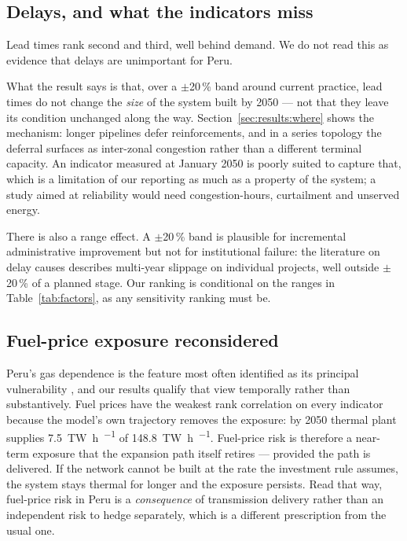 \subsection{Delays, and what the indicators miss}

Lead times rank second and third, well behind demand. We do not read this as evidence
that delays are unimportant for Peru.

What the result says is that, over a $\pm$20\,\% band around current practice, lead
times do not change the \emph{size} of the system built by 2050 --- not that they leave
its condition unchanged along the way. Section~\ref{sec:results:where} shows the
mechanism: longer pipelines defer reinforcements, and in a series topology the deferral
surfaces as inter-zonal congestion rather than a different terminal capacity. An
indicator measured at January 2050 is poorly suited to capture that, which is a
limitation of our reporting as much as a property of the system; a study aimed at
reliability would need congestion-hours, curtailment and unserved energy.

There is also a range effect. A $\pm$20\,\% band is plausible for incremental
administrative improvement but not for institutional failure: the literature on delay
causes \citep{sun2026,boateng2026} describes multi-year slippage on individual
projects, well outside $\pm$20\,\% of a planned stage. Our ranking is conditional on
the ranges in Table~\ref{tab:factors}, as any sensitivity ranking must be.

\subsection{Fuel-price exposure reconsidered}

Peru's gas dependence is the feature most often identified as its principal
vulnerability \citep{rudnick2019,enerdata2024,colinacalvo2024}, and our results qualify
that view temporally rather than substantively. Fuel prices have the weakest rank
correlation on every indicator because the model's own trajectory removes the exposure: by 2050
thermal plant supplies \SI{7.5}{\tera\watt\hour\per\year} of
\SI{148.8}{\tera\watt\hour\per\year}. Fuel-price risk is therefore a near-term exposure
that the expansion path itself retires --- provided the path is delivered. If the
network cannot be built at the rate the investment rule assumes, the system stays
thermal for longer and the exposure persists. Read that way, fuel-price risk in Peru is
a \emph{consequence} of transmission delivery rather than an independent risk to hedge
separately, which is a different prescription from the usual one.

